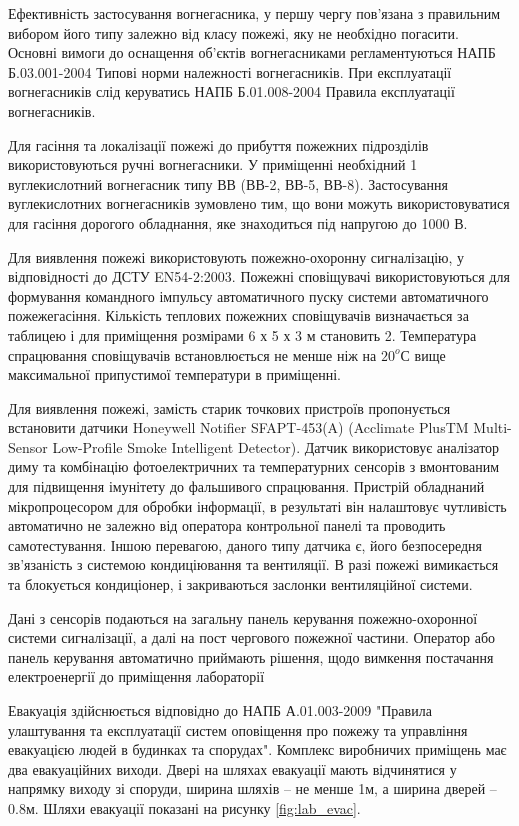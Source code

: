 Ефективність застосування вогнегасника, у першу чергу пов’язана з правильним вибором його типу залежно від класу пожежі, яку не необхідно погасити. Основні вимоги до оснащення об’єктів вогнегасниками регламентуються НАПБ Б.03.001-2004 Типові норми належності вогнегасників. При експлуатації вогнегасників слід керуватись НАПБ Б.01.008-2004 Правила експлуатації вогнегасників.

Для гасіння та локалізації пожежі до прибуття пожежних підрозділів використовуються ручні вогнегасники.  У приміщенні необхідний 1  вуглекислотний вогнегасник типу ВВ (ВВ-2, ВВ-5, ВВ-8). Застосування вуглекислотних вогнегасників зумовлено тим, що вони можуть використовуватися для гасіння дорогого обладнання, яке знаходиться під напругою до 1000 В. 

Для виявлення пожежі використовують пожежно-охоронну сигналізацію, у відповідності до ДСТУ EN54-2:2003. Пожежні сповіщувачі використовуються для формування командного імпульсу автоматичного пуску системи автоматичного пожежегасіння. Кількість теплових пожежних сповіщувачів визначається за таблицею і для приміщення розмірами 6 х 5 х 3 м становить 2. 
Температура спрацювання сповіщувачів встановлюється не менше ніж на $20^o$С вище 
максимальної припустимої температури в приміщенні.

Для виявлення пожежі, замість старик точкових пристроїв пропонується встановити датчики Honeywell Notifier SFAPT-453(A)
(Acclimate PlusTM Multi-Sensor Low-Profile Smoke Intelligent Detector). Датчик використовує аналізатор диму та комбінацію фотоелектричних та температурних сенсорів з вмонтованим для підвищення імунітету до фальшивого спрацювання. Пристрій обладнаний мікропроцесором для обробки інформації, в результаті він налаштовує чутливість автоматично не залежно від оператора контрольної панелі та проводить самотестування. Іншою перевагою, даного типу датчика є, його безпосередня зв'язаність з системою кондиціювання та вентиляції. В разі пожежі вимикається та блокується кондиціонер,
і закриваються заслонки вентиляційної системи.

Дані з сенсорів подаються на загальну панель керування пожежно-охоронної системи сигналізації, а далі на пост чергового пожежної частини. Оператор або панель керування автоматично приймають рішення, щодо вимкення постачання електроенергії
до приміщення лабораторії

Евакуація здійснюється відповідно до НАПБ А.01.003-2009 "Правила улаштування та експлуатації систем оповіщення про пожежу та управління евакуацією людей в будинках та спорудах". Комплекс виробничих приміщень має два евакуаційних виходи. Двері на шляхах евакуації мають відчинятися у напрямку виходу зі споруди, ширина шляхів -- не менше 1м, а ширина дверей -- 0.8м. Шляхи евакуації показані на рисунку \ref{fig:lab_evac}.

